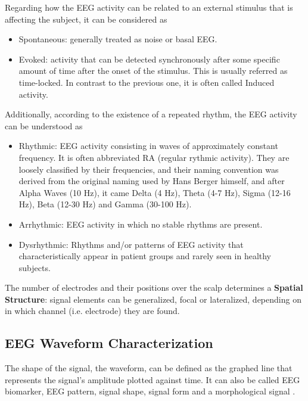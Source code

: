 \documentclass[brainsci,article,submit,moreauthors,pdftex,10pt,a4paper]{mdpi}
\begin{document}
Regarding how the EEG activity can be related to an external stimulus that is affecting the subject, it can be considered as

\begin{itemize}
\item Spontaneous: generally treated as noise or basal EEG.
\item Evoked: activity that can be detected synchronously after some specific amount of time after the onset of the stimulus.  This is usually referred as time-locked.  In contrast to the previous one, it is often called Induced activity.
\end{itemize}

\noindent Additionally, according to the existence of a repeated rhythm, the EEG activity can be understood as

\begin{itemize}
\item Rhythmic: EEG activity consisting in waves of approximately constant frequency.  It is often abbreviated RA (regular rythmic activity). They are loosely classified by their frequencies, and their naming convention was derived from the original naming used by Hans Berger himself, and after Alpha Waves (10 Hz), it came Delta (4 Hz), Theta (4-7 Hz), Sigma (12-16 Hz), Beta (12-30 Hz) and Gamma (30-100 Hz).  
\item Arrhythmic: EEG activity in which no stable rhythms are present.  
\item Dysrhythmic: Rhythms and/or patterns of EEG activity that characteristically appear in patient groups and rarely seen in healthy subjects.
\end{itemize}

The number of electrodes and their positions over the scalp determines a \textbf{Spatial Structure}: signal elements can be generalized, focal or lateralized, depending on in which channel (i.e. electrode) they are found.



\subsection{EEG Waveform Characterization}

The shape of the signal, the waveform, can be defined as the graphed line that represents the signal's amplitude plotted against time. It can also be called EEG biomarker,  EEG pattern, signal shape, signal form and a morphological signal \citep{Jansen1991}.
\end{document}
